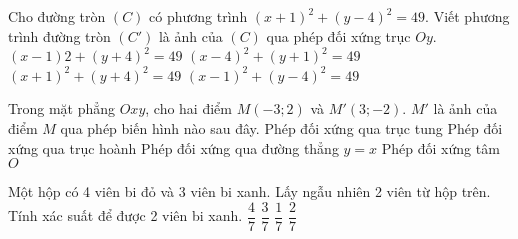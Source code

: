 \begin{ex}%
	Cho đường tròn $(C)$ có phương trình $(x+1)^2+(y-4)^2=49$. Viết phương trình đường tròn $(C')$ là ảnh của $(C)$ qua phép đối xứng trục $Oy$.
\choice
{$(x-1)2+(y+4)^2=49$}
{$(x-4)^2+(y+1)^2=49$}
{$(x+1)^2+(y+4)^2=49$}
{\True $(x-1)^2+(y-4)^2=49$}
\end{ex}
\begin{ex}%
Trong mặt phẳng $Oxy$, cho hai điểm $M(-3;2)$ và $M'(3;-2)$. $M'$ là ảnh của điểm $M$ qua phép biến hình nào sau đây.
\choice
{Phép đối xứng qua trục tung}
{Phép đối xứng qua trục hoành}
{Phép đối xứng qua đường thẳng $y=x$}
{\True Phép đối xứng tâm $O$}
\end{ex}
\begin{ex}%
Một hộp có 4 viên bi đỏ và 3 viên bi xanh. Lấy ngẫu nhiên 2 viên từ hộp trên. Tính xác suất để được 2 viên bi xanh.
\choice
{$\dfrac{4}{7}$}
{$\dfrac{3}{7}$}
{\True $\dfrac{1}{7}$}
{$\dfrac{2}{7}$}
\end{ex}
